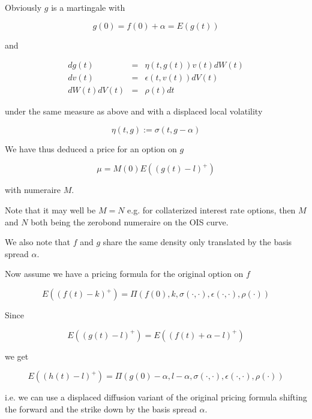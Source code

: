 \documentclass{amsart}
\theoremstyle{plain}
\numberwithin{equation}{section}
\begin{document}
Obviously $g$ is a martingale with 

\begin{equation}
g(0) = f(0) + \alpha = E( g(t) )
\end{equation}

and 

\begin{eqnarray}
dg(t) &=& \eta(t,g(t)) v(t) dW(t) \\
dv(t) &=& \epsilon(t,v(t)) dV(t) \\
dW(t) dV(t) &=& \rho(t) dt
\end{eqnarray}

under the same measure as above and with a displaced local volatility 

\begin{equation}
\eta(t,g) := \sigma(t,g-\alpha)
\end{equation}

We have thus deduced a price for an option on $g$

\begin{equation}
\mu = M(0) E( (g(t)-l)^+ ) 
\end{equation}

with numeraire $M$.

Note that it may well be $M=N$ e.g. for collaterized interest rate options, then $M$ and $N$ both being the zerobond numeraire on the OIS curve.

We also note that $f$ and $g$ share the same density only translated by the basis spread $\alpha$.

Now assume we have a pricing formula for the original option on $f$

\begin{equation}
E( (f(t) - k)^+ ) = \Pi(f(0),k,\sigma(\cdot,\cdot),\epsilon(\cdot,\cdot),\rho(\cdot))
\end{equation}

Since 

\begin{equation}
E( (g(t)-l)^+ ) = E( (f(t)+\alpha-l)^+ )
\end{equation}

we get

\begin{equation}
E( (h(t)-l)^+ ) = \Pi(g(0)-\alpha,l-\alpha,\sigma(\cdot,\cdot),\epsilon(\cdot,\cdot),\rho(\cdot))
\end{equation}

i.e. we can use a displaced diffusion variant of the original pricing formula shifting the forward and
the strike down by the basis spread $\alpha$.
\end{document}
